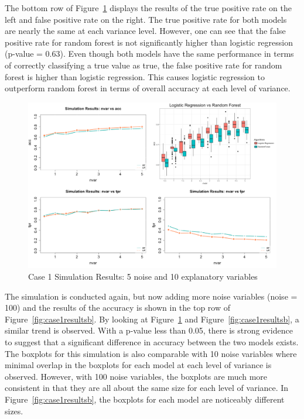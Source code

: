 \documentclass{llncs}
\begin{document}
\noindent 
The bottom row of Figure~\ref{fig:case1results} displays the results of the true positive rate on the left and false positive rate on the right. The true positive rate for both models are nearly the same at each variance level.  However, one can see that the false positive rate for random forest is not significantly higher than logistic regression (p-value = 0.63).  Even though both models have the same performance in terms of correctly classifying a true value as true, the false positive rate for random forest is higher than logistic regression.  This causes logistic regression to outperform random forest in terms of overall accuracy at each level of variance.

\begin{figure}
\centering
\includegraphics[scale=0.55]{case1.png}
\caption{Case 1 Simulation Results: 5 noise and 10 explanatory variables}
\label{fig:case1results}
\end{figure}
\noindent 
The simulation is conducted again, but now adding more noise variables (noise = 100) and the results of the accuracy is shown in the top row of Figure~\ref{fig:case1resultsb}. By looking at Figure~\ref{fig:case1results} and Figure~\ref{fig:case1resultsb}, a similar trend is observed. With a p-value less than 0.05, there is strong evidence to suggest that a significant difference in accuracy between the two models exists. The boxplots for this simulation is also comparable with 10 noise variables where minimal overlap in the boxplots for each model at each level of variance is observed. However, with 100 noise variables, the boxplots are much more consistent in that they are all about the same size for each level of variance.  In Figure~\ref{fig:case1resultsb}, the boxplots for each model are noticeably different sizes.
\end{document}
